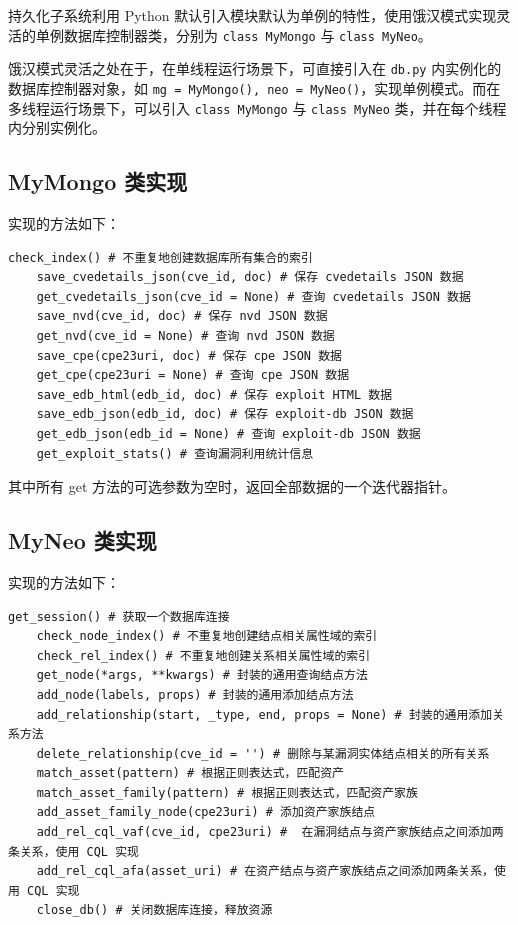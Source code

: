 \documentclass[a4paper,AutoFakeBold,oneside,12pt]{book}
\begin{document}
持久化子系统利用 Python 默认引入模块默认为单例的特性，使用饿汉模式\cite{singleton}实现灵活的单例数据库控制器类，分别为 \lstinline|class MyMongo| 与 \lstinline|class MyNeo|。

饿汉模式灵活之处在于，在单线程运行场景下，可直接引入在 \lstinline|db.py| 内实例化的数据库控制器对象，如 \lstinline|mg = MyMongo(), neo = MyNeo()|，实现单例模式。而在多线程运行场景下，可以引入 \lstinline|class MyMongo| 与 \lstinline|class MyNeo| 类，并在每个线程内分别实例化。

\subsection{MyMongo 类实现}

实现的方法如下：
\begin{lstlisting}[style=lgeneral]
	check_index() # 不重复地创建数据库所有集合的索引
	save_cvedetails_json(cve_id, doc) # 保存 cvedetails JSON 数据
	get_cvedetails_json(cve_id = None) # 查询 cvedetails JSON 数据
	save_nvd(cve_id, doc) # 保存 nvd JSON 数据
	get_nvd(cve_id = None) # 查询 nvd JSON 数据
	save_cpe(cpe23uri, doc) # 保存 cpe JSON 数据
	get_cpe(cpe23uri = None) # 查询 cpe JSON 数据
	save_edb_html(edb_id, doc) # 保存 exploit HTML 数据
	save_edb_json(edb_id, doc) # 保存 exploit-db JSON 数据
	get_edb_json(edb_id = None) # 查询 exploit-db JSON 数据
	get_exploit_stats() # 查询漏洞利用统计信息
\end{lstlisting}
其中所有 get 方法的可选参数为空时，返回全部数据的一个迭代器指针。

\subsection{MyNeo 类实现}

实现的方法如下：
\begin{lstlisting}[style=lgeneral]
	get_session() # 获取一个数据库连接
	check_node_index() # 不重复地创建结点相关属性域的索引
	check_rel_index() # 不重复地创建关系相关属性域的索引
	get_node(*args, **kwargs) # 封装的通用查询结点方法
	add_node(labels, props) # 封装的通用添加结点方法
	add_relationship(start, _type, end, props = None) # 封装的通用添加关系方法
	delete_relationship(cve_id = '') # 删除与某漏洞实体结点相关的所有关系
	match_asset(pattern) # 根据正则表达式，匹配资产
	match_asset_family(pattern) # 根据正则表达式，匹配资产家族
	add_asset_family_node(cpe23uri) # 添加资产家族结点
	add_rel_cql_vaf(cve_id, cpe23uri) #  在漏洞结点与资产家族结点之间添加两条关系，使用 CQL 实现
	add_rel_cql_afa(asset_uri) # 在资产结点与资产家族结点之间添加两条关系，使用 CQL 实现
	close_db() # 关闭数据库连接，释放资源
\end{lstlisting}
\end{document}
